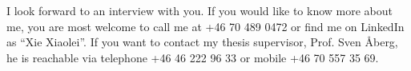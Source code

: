 \documentclass[10pt,a4paper, gentium]{moderncv}        %
\begin{document}


I look forward to an interview with you. If you would like to know more
about me, you are most welcome to call me at +46 70 489 0472 or find
me on LinkedIn as ``Xie Xiaolei''. If you want to contact my thesis
supervisor, Prof. Sven \AA berg, he is reachable via telephone +46 46 222
96 33 or mobile +46 70 557 35 69.

\makeletterclosing
\end{document}
